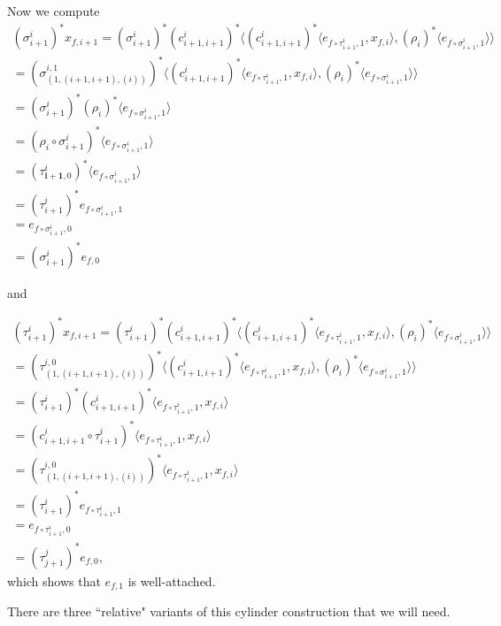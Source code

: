  Now we compute \begin{align*}(\sigma^i_{i+1})^* x_{f, i+1} = (\sigma^i_{i+1})^* (c^i_{i+1, i+1})^* \langle (c^i_{i+1, i+1})^* \langle e_{f \circ \tau^i_{i+1},1}, x_{f, i} \rangle, (\rho_i)^* \langle e_{f \circ \sigma^i_{i+1}, 1}\rangle \rangle \\ = (\sigma^{i, 1}_{(1, (i+1, i+1), (i))})^* \langle (c^i_{i+1, i+1})^* \langle e_{f \circ \tau^i_{i+1},1}, x_{f, i} \rangle, (\rho_i)^* \langle e_{f \circ \sigma^i_{i+1}, 1}\rangle \rangle \\ = (\sigma^i_{i+1})^* (\rho_i)^* \langle e_{f \circ \sigma^i_{i+1}, 1}\rangle\\
= (\rho_i \circ \sigma^i_{i+1})^* \langle e_{f \circ \sigma^i_{i+1}, 1}\rangle \\
= (\tau^i_{\mathbf{i + 1}, 0})^*  \langle e_{f \circ \sigma^i_{i+1}, 1}\rangle \\
= (\tau^i_{i+1})^* e_{f \circ \sigma^i_{i+1}, 1}\\ = e_{f \circ \sigma^i_{i+1}, 0} \\ = (\sigma^i_{i+1})^* e_{f, 0}\end{align*}

and 

\begin{align*}(\tau^i_{i+1})^* x_{f, i+1} = (\tau^i_{i+1})^* (c^i_{i+1, i+1})^* \langle (c^i_{i+1, i+1})^* \langle e_{f \circ \tau^i_{i+1},1}, x_{f, i} \rangle, (\rho_i)^* \langle e_{f \circ \sigma^i_{i+1}, 1}\rangle \rangle \\ = (\tau^{i, 0}_{(1, (i+1, i+1), (i))})^* \langle (c^i_{i+1, i+1})^* \langle e_{f \circ \tau^i_{i+1},1}, x_{f, i} \rangle, (\rho_i)^* \langle e_{f \circ \sigma^i_{i+1}, 1}\rangle \rangle \\ = (\tau^i_{i+1})^* (c^i_{i+1, i+1})^* \langle e_{f \circ \tau^i_{i+1},1}, x_{f, i} \rangle \\ = (c^i_{i+1, i+1} \circ \tau^i_{i+1})^* \langle e_{f \circ \tau^i_{i+1},1}, x_{f, i} \rangle \\ = (\tau^{i, 0}_{(1, (i+1, i+1), (i))})^* \langle e_{f \circ \tau^i_{i+1},1}, x_{f, i} \rangle \\ = (\tau^i_{i+1})^*  e_{f \circ \tau^i_{i+1},1}\\ = e_{f \circ \tau^i_{i+1}, 0}\\ = (\tau^j_{j+1})^* e_{f, 0},  \end{align*} which shows that $e_{f, 1}$ is well-attached.

There are three ``relative" variants of this cylinder construction that we will need.

